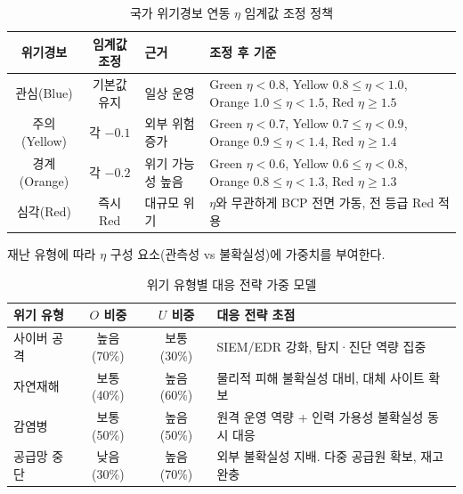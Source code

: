 \begin{table}[htbp]
\centering
\caption{국가 위기경보 연동 $\eta$ 임계값 조정 정책}
\label{tab:app-policy-adjustment}
\small
{}
\begin{tabularx}{\textwidth}{c c X W}
\toprule
\textbf{위기경보} & \textbf{임계값 조정} & \textbf{근거} & \textbf{조정 후 기준} \\
\midrule
관심(Blue) & 기본값 유지 &
  일상 운영 &
  Green $\eta < 0.8$,\; Yellow $0.8 \leq \eta < 1.0$,\; Orange $1.0 \leq \eta < 1.5$,\; Red $\eta \geq 1.5$ \\
\addlinespace
주의(Yellow) & 각 $-0.1$ &
  외부 위험 증가 &
  Green $\eta < 0.7$,\; Yellow $0.7 \leq \eta < 0.9$,\; Orange $0.9 \leq \eta < 1.4$,\; Red $\eta \geq 1.4$ \\
\addlinespace
경계(Orange) & 각 $-0.2$ &
  위기 가능성 높음 &
  Green $\eta < 0.6$,\; Yellow $0.6 \leq \eta < 0.8$,\; Orange $0.8 \leq \eta < 1.3$,\; Red $\eta \geq 1.3$ \\
\addlinespace
심각(Red) & 즉시 Red &
  대규모 위기 &
  $\eta$와 무관하게 BCP 전면 가동, 전 등급 Red 적용 \\
\bottomrule
\end{tabularx}
\end{table}


재난 유형에 따라 $\eta$ 구성 요소(관측성 vs 불확실성)에 가중치를 부여한다.

\begin{table}[htbp]
\centering
\caption{위기 유형별 대응 전략 가중 모델}
\label{tab:app-crisis-type-weight}
\small
\begin{tabularx}{\textwidth}{l c c X}
\toprule
\textbf{위기 유형} & \textbf{$O$ 비중} & \textbf{$U$ 비중} & \textbf{대응 전략 초점} \\
\midrule
사이버 공격 & 높음 (70\%) & 보통 (30\%) &
  SIEM/EDR 강화, 탐지·진단 역량 집중 \\
\addlinespace
자연재해 & 보통 (40\%) & 높음 (60\%) &
  물리적 피해 불확실성 대비, 대체 사이트 확보 \\
\addlinespace
감염병 & 보통 (50\%) & 높음 (50\%) &
  원격 운영 역량 + 인력 가용성 불확실성 동시 대응 \\
\addlinespace
공급망 중단 & 낮음 (30\%) & 높음 (70\%) &
  외부 불확실성 지배. 다중 공급원 확보, 재고 완충 \\
\bottomrule
\end{tabularx}
\end{table}


